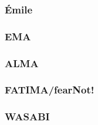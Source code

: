 \subsubsection{Émile} %
\subsubsection{EMA} %
\subsubsection{ALMA} %
\subsubsection{FATIMA/fearNot!} %
\subsubsection{WASABI} %

